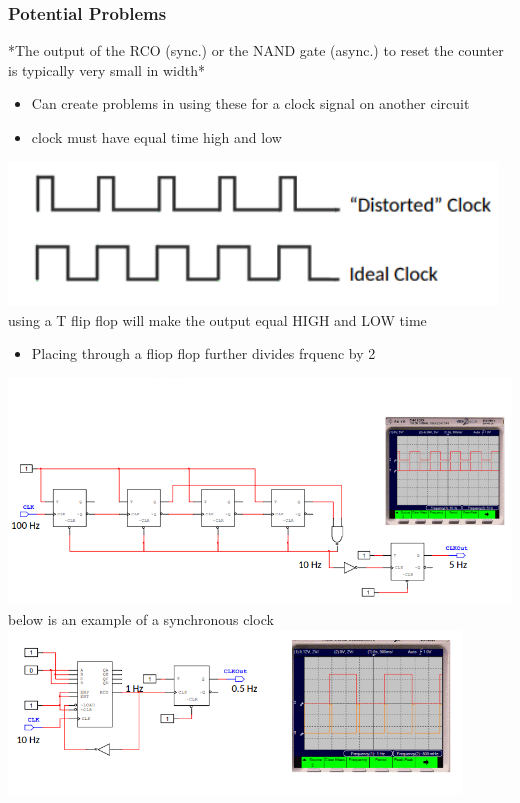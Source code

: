 \documentclass[a4paper,12pt]{article}
\begin{document}
            \subsubsection{Potential Problems}
            *The output of the RCO (sync.) or the NAND gate (async.) to reset the counter is typically very small in width*
            \begin{itemize}
                \item Can create problems in using these for a clock signal on another circuit
                \item clock must have equal time high and low
            \end{itemize}
            \includegraphics[width=13cm]{distortedVidealCLK.png}
            \\using a T flip flop will make the output equal HIGH and LOW time
            \begin{itemize}
                \item Placing through a fliop flop further divides frquenc by 2
            \end{itemize}
            \includegraphics[width=15cm]{creatingClockSig.png}
            \\below is an example of a synchronous clock\\
            \includegraphics*[width=12cm]{SyncExample.png}
\end{document}
